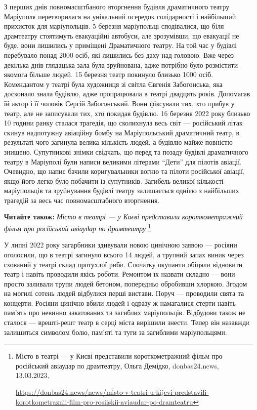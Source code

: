 З перших днів повномасштбаного вторгнення будівля драматичного театру Маріуполя
перетворилася на унікальний осередок солідарності і найбільший прихисток для
маріупольців. 5 березня маріупольці сподівалися, що біля драмтеатру стоятимуть
евакуаційні автобуси, але зрозумівши, що евакуації не буде, вони лишились у
приміщені Драматичного театру. На той час у будівлі перебувало понад 2000 осіб,
які лишились без даху над головою. Вже через декілька днів глядацька зала була
зруйнована, адже потрібно було розмістити якомога більше людей. 15 березня
театр покинуло близько 1000 осіб. Комендантом у театрі була художниця зі світла
Євгенія Забогонська, яка досконало знала будівлю, адже пропрацювала в театрі
двадцять років. Допомагав їй актор і її чоловік Сергій Забогонський. Вони
фіксували тих, хто прибув у театр, але не записували тих, хто покидав будівлю.
16 березня 2022 року близько 10 години ранку сталася трагедія, що сколихнула
весь світ — російський літак скинув надпотужну авіаційну бомбу на
Маріупольський драматичний театр, в результаті чого загинула велика кількість
людей, а будівлю майже повністю знищено. Супутникові знімки свідчать, що перед
та позаду будівлі драматичного театру в Маріуполі були написи великими літерами
\enquote{Дети} для пілотів авіації. Очевидно, що напис бачили коригувальники
вогню та пілоти російської авіації, якщо його легко було побачити із
супутників.  Загибель великої кількості маріупольців та зруйнування будівлі
театру залишається однією з найбільших трагедій за весь час повномасштабного
вторгнення.


\textbf{Читайте також:} \emph{Місто в театрі — у Києві представили короткометражний фільм про російський авіаудар по драмтеатру}%
\footnote{Місто в театрі — у Києві представили короткометражний фільм про російський авіаудар по драмтеатру, %
Ольга Демідко, donbas24.news, 13.03.2023, \par%
\url{https://donbas24.news/news/misto-v-teatri-u-kijevi-predstavili-korotkometraznii-film-pro-rosiiskii-aviaudar-po-dramteatru}%
}

У липні 2022 року загарбники здивували новою цинічною заявою — росіяни
оголосили, що в театрі загинуло всього 14 людей, а трупний запах виник через
схований у театрі склад протухлої риби. Спочатку окупанти обіцяли відновити
театр і навіть проводили якісь роботи. Ремонтом їх назвати складно — вони
просто заливали трупи людей бетоном, попередньо обробивши хлоркою. Згодом на
могилі сотень людей відбулися перші вистави. Поруч — проводили свята та
концерти. Росіяни цинічно вбили людей і одразу ж намагалися стерти навіть
пам'ять про невинно закатованих та загиблих маріупольців. Відбудови також не
сталося — врешті-решт театр в серці міста вирішили знести. Тепер він назавжди
залишиться символом болю, пам'яті та туги за загиблими маріупольцями.

